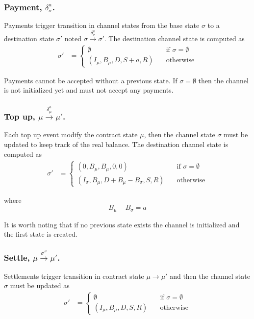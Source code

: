 \documentclass{llncs}
\begin{document}
\subsubsection{Payment, $\delta_\sigma^a$.} Payments trigger transition in channel states from the base state $\sigma$ to a destination state $\sigma'$ noted $\sigma \xrightarrow{\delta_\sigma^a} \sigma'$.
The destination channel state is computed as
\begin{equation*}
\begin{split}
  \sigma' &=
  \begin{cases}
      \emptyset & \quad \text{if } \sigma = \emptyset \\
      (I_\mu, B_\mu, D, S+a, R) & \quad \text{otherwise}
  \end{cases}
\end{split}
\end{equation*}

Payments cannot be accepted without a previous state. If $\sigma = \emptyset$ then the channel is not initialized yet and must not accept any payments.

\subsubsection{Top up, $\mu \xrightarrow{\delta_\mu^a} \mu'$.} Each top up event modify the contract state $\mu$, then the channel state $\sigma$ must be updated to keep track of the real balance. The destination channel state is computed as \begin{equation*}
\begin{split}
  \sigma' &=
  \begin{cases}
      (0, B_\mu, B_\mu, 0, 0) & \quad \text{if } \sigma = \emptyset \\
      (I_\sigma, B_\mu, D + B_\mu - B_\sigma, S, R) & \quad \text{otherwise}
  \end{cases}
\end{split}
\end{equation*}

where
$$B_\mu - B_\sigma = a$$

It is worth noting that if no previous state exists the channel is initialized and the first state is created.

\subsubsection{Settle, $\mu \xrightarrow{\sigma''} \mu'$.} Settlements trigger transition in contract state $\mu \rightarrow \mu'$ and then the channel state $\sigma$ must be updated as
\begin{equation*}
\begin{split}
  \sigma' &=
  \begin{cases}
      \emptyset & \quad \text{if } \sigma = \emptyset \\
      (I_\mu, B_\mu, D, S, R) & \quad \text{otherwise}
  \end{cases}
\end{split}
\end{equation*}
\end{document}
